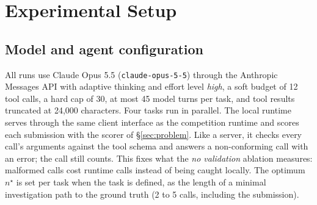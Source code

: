 \section{Experimental Setup}
\label{sec:experiments}

\subsection{Model and agent configuration}
All runs use Claude Opus 5.5 (\texttt{claude-opus-5-5}) through the Anthropic Messages API with adaptive
thinking and effort level \emph{high}, a soft budget of 12 tool calls, a hard cap of 30, at most 45 model turns
per task, and tool results truncated at 24{,}000 characters. Four tasks run in parallel. The local runtime
serves \bench through the same client interface as the competition runtime and scores each submission with
the scorer of \S\ref{sec:problem}. Like a server, it checks every call's arguments against the tool schema
and answers a non-conforming call with an error; the call still counts. This fixes what the \emph{no
validation} ablation measures: malformed calls cost runtime calls instead of being caught locally. The optimum $n^\star$ is set per task when the task is defined, as the
length of a minimal investigation path to the ground truth (2 to 5 calls, including the submission).

